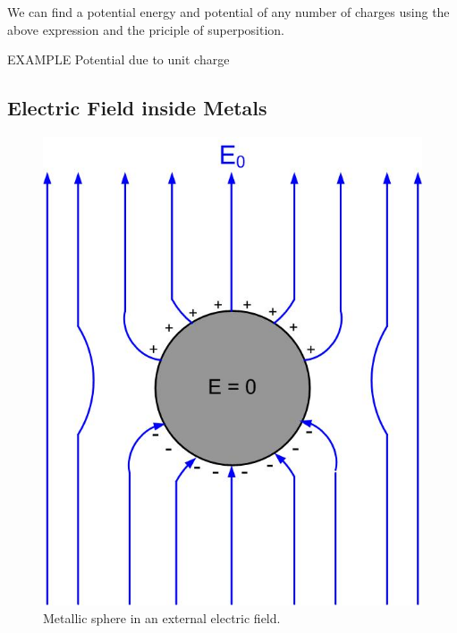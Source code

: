 \documentclass{ximera}
\begin{document}
We can find a potential energy and potential of any number of charges using the above expression and the priciple of superposition. 













{\large EXAMPLE} Potential due to unit charge



\subsection{Electric Field inside Metals}





\begin{figure}[htbp]
\begin{center}
\includegraphics[scale=0.5]{../jpg/metalsphereinefield.jpg}
\end{center}
\caption{Metallic sphere in an external electric field.}
\label{BoundaryConditionMetal}
\end{figure}
\end{document}
